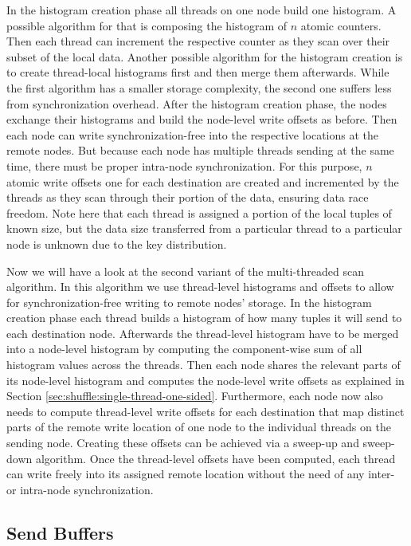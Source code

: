 In the histogram creation phase all threads on one node build one histogram.
A possible algorithm for that is composing the histogram of $n$ atomic counters.
Then each thread can increment the respective counter as they scan over their subset of the local data.
Another possible algorithm for the histogram creation is to create thread-local histograms first and then merge them afterwards.
While the first algorithm has a smaller storage complexity, the second one suffers less from synchronization overhead.
After the histogram creation phase, the nodes exchange their histograms and build the node-level write offsets as before.
Then each node can write synchronization-free into the respective locations at the remote nodes.
But because each node has multiple threads sending at the same time, there must be proper intra-node synchronization.
For this purpose, $n$ atomic write offsets \textendash{} one for each destination \textendash{} are created and incremented by the threads as they scan through their portion of the data, ensuring data race freedom.
Note here that each thread is assigned a portion of the local tuples of known size, but the data size transferred from a particular thread to a particular node is unknown due to the key distribution.

Now we will have a look at the second variant of the multi-threaded scan algorithm.
In this algorithm we use thread-level histograms and offsets to allow for synchronization-free writing to remote nodes' storage.
In the histogram creation phase each thread builds a histogram of how many tuples it will send to each destination node.
Afterwards the thread-level histogram have to be merged into a node-level histogram by computing the component-wise sum of all histogram values across the threads.
Then each node shares the relevant parts of its node-level histogram and computes the node-level write offsets as explained in Section \ref{sec:shuffle:single-thread-one-sided}.
Furthermore, each node now also needs to compute thread-level write offsets for each destination that map distinct parts of the remote write location of one node to the individual threads on the sending node.
Creating these offsets can be achieved via a sweep-up and sweep-down algorithm. %
Once the thread-level offsets have been computed, each thread can write freely into its assigned remote location without the need of any inter- or intra-node synchronization.

\subsection{Send Buffers}
\label{sec:shuffle:send-buffers}

